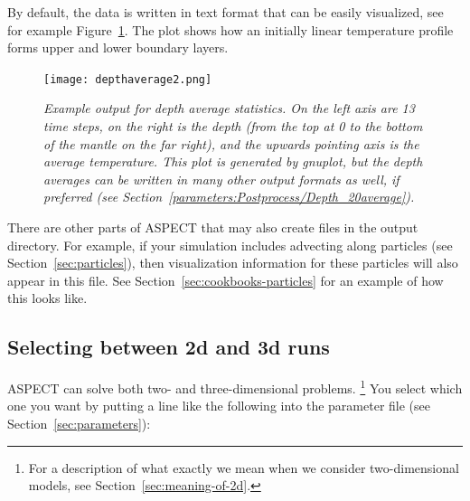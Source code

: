 \documentclass{article}
\newcommand{\aspect}{\textsc{ASPECT}}
\begin{document}
\begin{itemize}
  By default, the data is written in text format that can be easily visualized,
  see for example Figure~\ref{fig:depthaverage}. The plot
  shows how an initially linear temperature profile forms upper and lower
  boundary layers.

\begin{figure}[tbp]
  \centering
  \texttt{[image: depthaverage2.png]}
  \caption{\it Example output for depth average statistics. On the left axis are 13 time
  steps, on the right is the depth (from the top at 0 to the bottom of the mantle on the
  far right), and the upwards pointing axis is the average temperature. This
  plot is generated by gnuplot, but the depth averages can be written in many
  other output formats as well, if preferred (see
  Section~\ref{parameters:Postprocess/Depth_20average}).}
  \label{fig:depthaverage}
\end{figure}

\end{itemize}

There are other parts of \aspect{} that may also create files in the output
directory. For example, if your simulation includes advecting along particles
(see Section~\ref{sec:particles}), then visualization information for these
particles will also appear in this file. See
Section~\ref{sec:cookbooks-particles} for an example of how this looks like.


\subsection{Selecting between 2d and 3d runs}
\label{sec:2d-vs-3d}

\aspect{} can solve both two- and three-dimensional problems.%
\footnote{For a description of what exactly we mean when we consider
two-dimensional models, see Section~\ref{sec:meaning-of-2d}.}
You select which one you want by putting a line like the following into
the parameter file (see Section~\ref{sec:parameters}):

\end{document}
